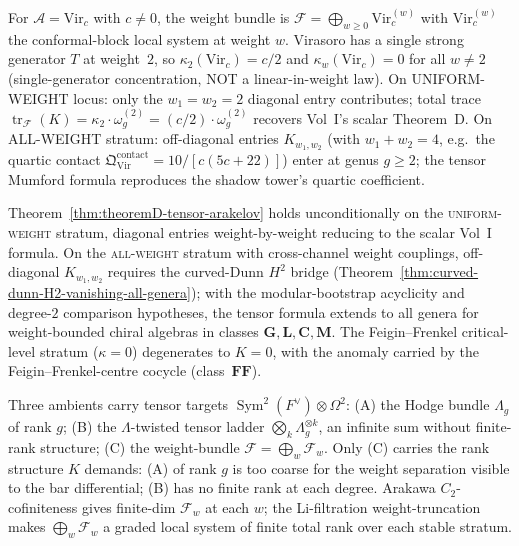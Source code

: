 \begin{example}[Virasoro: diagonal tensor curvature for
 UNIFORM-WEIGHT = scalar]
\label{ex:theoremD-virasoro}
For $\mathcal{A} = \mathrm{Vir}_c$ with $c \neq 0$, the weight
bundle is $\mathcal{F} = \bigoplus_{w \ge 0} \mathrm{Vir}_c^{(w)}$
with $\mathrm{Vir}_c^{(w)}$ the conformal-block local system at
weight $w$. Virasoro has a single strong generator $T$ at
weight~$2$, so $\kappa_2(\mathrm{Vir}_c) = c/2$ and
$\kappa_w(\mathrm{Vir}_c) = 0$ for all $w \neq 2$ (single-generator
concentration, NOT a linear-in-weight law).
On UNIFORM-WEIGHT locus: only the $w_1 = w_2 = 2$ diagonal entry
contributes; total trace
$\operatorname{tr}_\mathcal{F}(K) = \kappa_2 \cdot \omega_g^{(2)} =
(c/2) \cdot \omega_g^{(2)}$ recovers Vol~I's scalar Theorem~D. On ALL-WEIGHT stratum: off-diagonal
entries $K_{w_1, w_2}$ (with $w_1 + w_2 = 4$, e.g.\ the quartic
contact $\mathfrak{Q}^{\mathrm{contact}}_{\mathrm{Vir}} =
10/[c(5c+22)]$) enter at genus $g \ge 2$; the tensor Mumford
formula reproduces the shadow tower's quartic coefficient.
\end{example}

\begin{remark}
\label{rem:theoremD-tensor-scope}
Theorem~\ref{thm:theoremD-tensor-arakelov} holds unconditionally
on the \textsc{uniform-weight} stratum, diagonal entries
weight-by-weight reducing to the scalar Vol~I formula. On the
\textsc{all-weight} stratum with cross-channel weight couplings,
off-diagonal $K_{w_1, w_2}$ requires the curved-Dunn $H^2$ bridge
(Theorem~\ref{thm:curved-dunn-H2-vanishing-all-genera}); with the
modular-bootstrap acyclicity and degree-\(2\) comparison
hypotheses, the tensor formula extends to all genera for
weight-bounded chiral algebras in classes
$\mathbf{G}, \mathbf{L}, \mathbf{C}, \mathbf{M}$. The
Feigin--Frenkel critical-level stratum ($\kappa = 0$) degenerates
to $K = 0$, with the anomaly carried by the Feigin--Frenkel-centre
cocycle (class~$\mathbf{FF}$).
\end{remark}

\begin{remark}
\label{rem:theoremD-ambient-identification}
Three ambients carry tensor targets
$\operatorname{Sym}^2(F^\vee) \otimes \Omega^2$:
(A) the Hodge bundle $\Lambda_g$ of rank $g$;
(B) the $\Lambda$-twisted tensor ladder
$\bigotimes_k \Lambda_g^{\otimes k}$, an infinite sum without
finite-rank structure;
(C) the weight-bundle
$\mathcal{F} = \bigoplus_w \mathcal{F}_w$. Only (C) carries the
rank structure $K$ demands: (A) of rank $g$ is too coarse for the
weight separation visible to the bar differential; (B) has no
finite rank at each degree. Arakawa $C_2$-cofiniteness gives
finite-dim $\mathcal{F}_w$ at each $w$; the Li-filtration
weight-truncation makes $\bigoplus_w \mathcal{F}_w$ a graded local
system of finite total rank over each stable stratum.
\end{remark}

